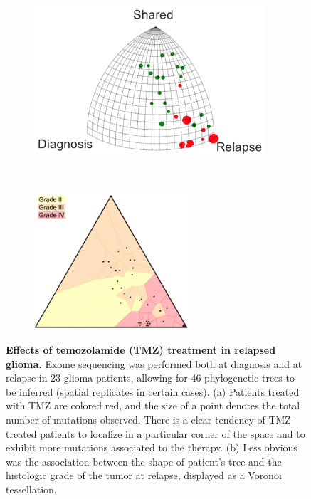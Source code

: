 \documentclass[a4paper,11pt]{article}
\begin{document}
\begin{figure}
    \begin{subfigure}{0.5\linewidth}
    \centering
    \includegraphics[height=2.2in]{../figures/glioma_triplet.png}
    \end{subfigure}
    ~
    \begin{subfigure}{0.5\linewidth}
    \centering
    \includegraphics[height=2in]{../figures/glioma_voronoi_stage.png}
    \end{subfigure}

    \caption{{\bf Effects of temozolamide (TMZ) treatment in relapsed glioma.} Exome sequencing was performed both at diagnosis and at relapse in 23 glioma patients, allowing for 46 phylogenetic trees to be inferred (spatial replicates in certain cases). (a) Patients treated with TMZ are colored red, and the size of a point denotes the total number of mutations observed. There is a clear tendency of TMZ-treated patients to localize in a particular corner of the space and to exhibit more mutations associated to the therapy. (b) Less obvious was the association between the shape of patient's tree and the histologic grade of the tumor at relapse, displayed as a Voronoi tessellation.}
    \label{fig:gliomaTMZ}
\end{figure}
\end{document}
